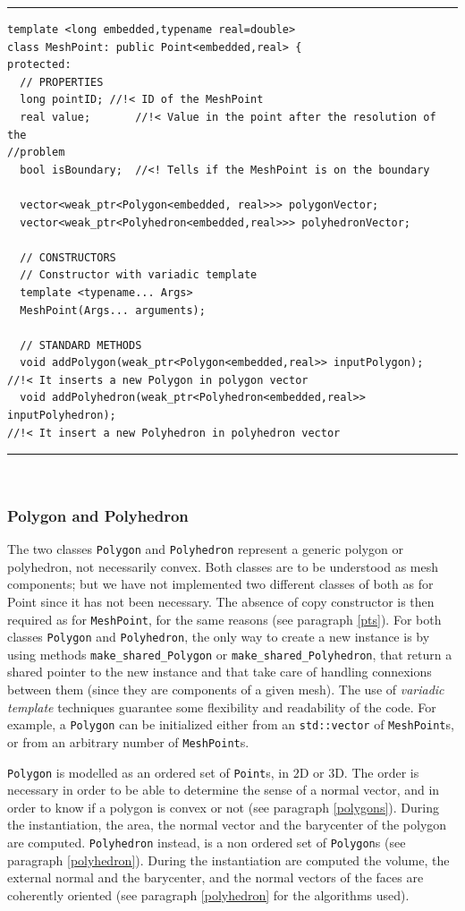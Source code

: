 \noindent\rule{16cm}{1pt}
\begin{lstlisting}[caption=File \texttt{MeshPoint.h}]
template <long embedded,typename real=double>
class MeshPoint: public Point<embedded,real> {
protected:
  // PROPERTIES
  long pointID;	//!< ID of the MeshPoint
  real value;		//!< Value in the point after the resolution of the 
//problem
  bool isBoundary;	//<! Tells if the MeshPoint is on the boundary

  vector<weak_ptr<Polygon<embedded, real>>> polygonVector;
  vector<weak_ptr<Polyhedron<embedded,real>>> polyhedronVector;

  // CONSTRUCTORS
  // Constructor with variadic template
  template <typename... Args>
  MeshPoint(Args... arguments);

  // STANDARD METHODS
  void addPolygon(weak_ptr<Polygon<embedded,real>> inputPolygon); 
//!< It inserts a new Polygon in polygon vector 
  void addPolyhedron(weak_ptr<Polyhedron<embedded,real>> inputPolyhedron); 
//!< It insert a new Polyhedron in polyhedron vector 
\end{lstlisting}

\noindent\rule{16cm}{1pt}\\

\subsubsection{Polygon and Polyhedron}
The two classes \verb|Polygon| and \verb|Polyhedron| represent a generic polygon or polyhedron, not necessarily convex. Both classes are to be understood as mesh components; but we have not implemented two different classes of both as for Point since it has not been necessary. The absence of copy constructor is then required as for \verb|MeshPoint|, for the same reasons (see paragraph \ref{pts}). For both classes \verb|Polygon| and \verb|Polyhedron|, the only way to create a new instance is by using methods \verb|make_shared_Polygon| or \verb|make_shared_Polyhedron|, that return a shared pointer to the new instance and that take care of handling connexions between them (since they are components of a given mesh). 
The use of \textit{variadic template} techniques guarantee some flexibility and readability of the code. For example, a \verb|Polygon| can be initialized either from an \verb|std::vector| of \verb|MeshPoint|s, or from an arbitrary number of \verb|MeshPoint|s. 

\verb|Polygon| is modelled as an ordered set of \verb|Point|s, in $2$D or $3$D. The order is necessary in order to be able to determine the sense of a normal vector, and in order to know if a polygon is convex or not (see paragraph \ref{polygons}). During the instantiation, the area, the normal vector and the barycenter of the polygon are computed. \verb|Polyhedron| instead, is a non ordered set of \verb|Polygon|s (see paragraph \ref{polyhedron}). During the instantiation are computed the volume, the external normal and the barycenter, and the normal vectors of the faces are coherently oriented (see paragraph \ref{polyhedron} for the algorithms used). \\

